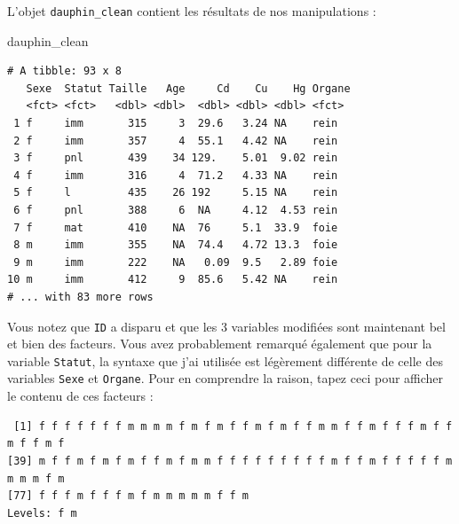 \documentclass[
  letterpaper,
  DIV=11,
  numbers=noendperiod]{scrreprt}
\newenvironment{Shaded}{\begin{snugshade}}{\end{snugshade}}
\newcommand{\NormalTok}[1]{\textcolor[rgb]{0.00,0.23,0.31}{#1}}
\newcommand{\SpecialCharTok}[1]{\textcolor[rgb]{0.37,0.37,0.37}{#1}}
\begin{document}
L'objet \texttt{dauphin\_clean} contient les résultats de nos
manipulations :

\begin{Shaded}
\begin{Highlighting}[]
\NormalTok{dauphin\_clean}
\end{Highlighting}
\end{Shaded}

\begin{verbatim}
# A tibble: 93 x 8
   Sexe  Statut Taille   Age     Cd    Cu    Hg Organe
   <fct> <fct>   <dbl> <dbl>  <dbl> <dbl> <dbl> <fct> 
 1 f     imm       315     3  29.6   3.24 NA    rein  
 2 f     imm       357     4  55.1   4.42 NA    rein  
 3 f     pnl       439    34 129.    5.01  9.02 rein  
 4 f     imm       316     4  71.2   4.33 NA    rein  
 5 f     l         435    26 192     5.15 NA    rein  
 6 f     pnl       388     6  NA     4.12  4.53 rein  
 7 f     mat       410    NA  76     5.1  33.9  foie  
 8 m     imm       355    NA  74.4   4.72 13.3  foie  
 9 m     imm       222    NA   0.09  9.5   2.89 foie  
10 m     imm       412     9  85.6   5.42 NA    rein  
# ... with 83 more rows
\end{verbatim}

Vous notez que \texttt{ID} a disparu et que les 3 variables modifiées
sont maintenant bel et bien des facteurs. Vous avez probablement
remarqué également que pour la variable \texttt{Statut}, la syntaxe que
j'ai utilisée est légèrement différente de celle des variables
\texttt{Sexe} et \texttt{Organe}. Pour en comprendre la raison, tapez
ceci pour afficher le contenu de ces facteurs :

\begin{Shaded}
\end{Shaded}

\begin{verbatim}
 [1] f f f f f f f m m m m f m f m f f m f m f f m m f f m f f f m f f m f f m f
[39] m f f m f m f m f f m f m m f f f f f f f f f m f f m f f f f f m m m m f m
[77] f f f m f f f m f m m m m m f f m
Levels: f m
\end{verbatim}

\begin{Shaded}
\end{Shaded}
\end{document}
